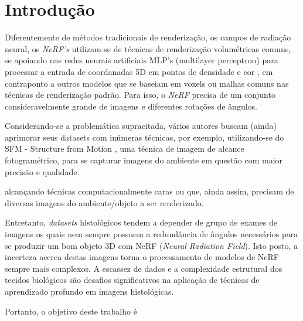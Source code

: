 \section{Introdução}
\label{sec:introducao}

Diferentemente de métodos tradicionais de renderização, os campos de radiação neural, os \textit{NeRF's} \cite{mildenhall2020nerfrepresentingscenesneural} utilizam-se de técnicas de renderização volumétricas comuns, se apoiando nas redes neurais artificiais MLP's (multilayer perceptron) \cite{GARDNER19982627} para processar a entrada de coordanadas 5D em pontos de densidade e cor \cite{mildenhall2020nerfrepresentingscenesneural}, em contraponto a outros modelos que se baseiam em voxels ou malhas comuns nas técnicas de renderização padrão. Para isso, o \textit{NeRF} precisa de um conjunto consideravelmente grande de imagens e diferentes rotações de ângulos.

Considerando-se a problemática supracitada, vários autores buscam (ainda) aprimorar seus datasets com inúmeras técnicas, por exemplo, utilizando-se do SFM - Structure from Motion%
, uma técnica de imagem de alcance fotogramétrico, para se capturar imagens do ambiente em questão com maior precisão e qualidade.

alcançando técnicas computacionalmente caras ou que, ainda assim, precisam de diversas imagens do ambiente/objeto a ser renderizado\cite{kerbl3Dgaussians}.

Entretanto, \textit{datasets} histológicos tendem a depender de grupo de exames de imagens os quais nem sempre possuem a redundância de ângulos necessários para se produzir um bom objeto 3D com NeRF (\textit{Neural Radiation Field})\cite{mildenhall2020nerfrepresentingscenesneural}. Isto posto, a incerteza acerca destas imagens torna o processamento de modelos de NeRF sempre mais complexos.
A escassez de dados e a complexidade estrutural dos tecidos biológicos são desafios significativos na aplicação de técnicas de aprendizado profundo em imagens histológicas.  

Portanto, o objetivo deste trabalho é